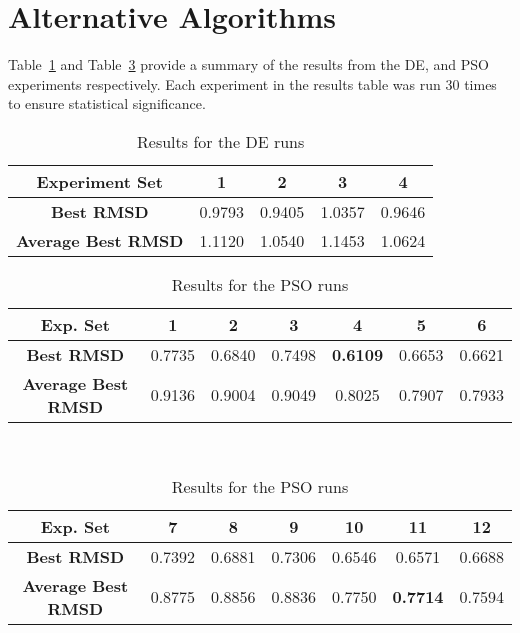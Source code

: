 \section{Alternative Algorithms}

Table~\ref{table:ea-de-results} and Table~\ref{table:ea-pso-results} provide a summary of the results from the DE, and PSO experiments respectively. Each experiment in the results table was run 30 times to ensure statistical significance.

\begin{table}
	\centering
	\begin{tabular}{ | >{\bfseries}c | c | c | c | c | }
		\hline
		Experiment Set & 1 & 2 & 3 & 4 \\ \hline
		Best RMSD & 0.9793 & 0.9405 & 1.0357 & 0.9646 \\ \hline
		Average Best RMSD & 1.1120 & 1.0540 & 1.1453 & 1.0624 \\ \hline
	\end{tabular}
	\caption{Results for the DE runs}
	\label{table:ea-de-results}
\end{table}

\begin{table}
	\centering
	\begin{tabular}{ | >{\bfseries}c | c | c | c | c | c | c | }
		\hline
		Exp. Set & 1 & 2 & 3 & 4 & 5 & 6 \\ \hline
		Best RMSD & 0.7735 & 0.6840 & 0.7498 & \textbf{0.6109} & 0.6653 & 0.6621 \\ \hline
		Average Best RMSD & 0.9136 & 0.9004 & 0.9049 & 0.8025 & 0.7907 & 0.7933 \\ \hline
	\end{tabular}
	\\
	\vspace{3 mm}
	\begin{tabular}{ | >{\bfseries}c | c | c | c | c | c | c | }
		\hline
		Exp. Set & 7 & 8 & 9 & 10 & 11 & 12 \\ \hline
		Best RMSD & 0.7392 & 0.6881 & 0.7306 & 0.6546 & 0.6571 & 0.6688 \\ \hline
		Average Best RMSD & 0.8775 & 0.8856 & 0.8836 & 0.7750 & \textbf{0.7714} & 0.7594 \\ \hline
	\end{tabular}
	\caption{Results for the PSO runs}
	\label{table:ea-pso-results}
\end{table}



